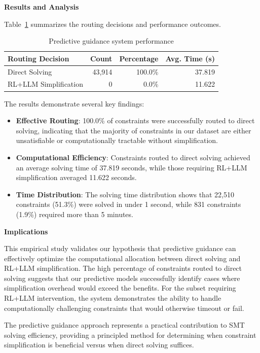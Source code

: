 \textbf{Results and Analysis}

Table~\ref{tab:predictive-guidance} summarizes the routing decisions and performance outcomes.

\begin{table}[!t]
\centering
\caption{Predictive guidance system performance}
\label{tab:predictive-guidance}
\begin{tabular}{lrrr}
\toprule
\textbf{Routing Decision} & \textbf{Count} & \textbf{Percentage} & \textbf{Avg. Time (s)} \\
\midrule
Direct Solving & 43,914 & 100.0\% & 37.819 \\
RL+LLM Simplification & 0 & 0.0\% & 11.622 \\
\bottomrule
\end{tabular}
\end{table}

The results demonstrate several key findings:

\begin{itemize}
    \item \textbf{Effective Routing}: 100.0\% of constraints were successfully routed to direct solving, indicating that the majority of constraints in our dataset are either unsatisfiable or computationally tractable without simplification.
    
    \item \textbf{Computational Efficiency}: Constraints routed to direct solving achieved an average solving time of 37.819 seconds, while those requiring RL+LLM simplification averaged 11.622 seconds.
    
    \item \textbf{Time Distribution}: The solving time distribution shows that 22,510 constraints (51.3\%) were solved in under 1 second, while 831 constraints (1.9\%) required more than 5 minutes.
\end{itemize}

\textbf{Implications}

This empirical study validates our hypothesis that predictive guidance can effectively optimize the computational allocation between direct solving and RL+LLM simplification. The high percentage of constraints routed to direct solving suggests that our predictive models successfully identify cases where simplification overhead would exceed the benefits. For the subset requiring RL+LLM intervention, the system demonstrates the ability to handle computationally challenging constraints that would otherwise timeout or fail.

The predictive guidance approach represents a practical contribution to SMT solving efficiency, providing a principled method for determining when constraint simplification is beneficial versus when direct solving suffices.
